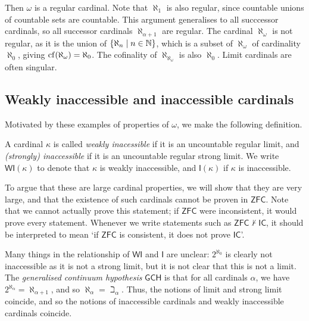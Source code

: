 \begin{enumerate}
    Then \( \omega \) is a regular cardinal.
    Note that \( \aleph_1 \) is also regular, since countable unions of countable sets are countable.
    This argument generalises to all succcessor cardinals, so all successor cardinals \( \aleph_{\alpha + 1} \) are regular.
    The cardinal \( \aleph_\omega \) is not regular, as it is the union of \( \qty{\aleph_n \mid n \in \mathbb N} \), which is a subset of \( \aleph_\omega \) of cardinality \( \aleph_0 \), giving \( \operatorname{cf}(\aleph_\omega) = \aleph_0 \).
    The cofinality of \( \aleph_{\aleph_\omega} \) is also \( \aleph_0 \).
    Limit cardinals are often singular.
\end{enumerate}

\subsection{Weakly inaccessible and inaccessible cardinals}
Motivated by these examples of properties of \( \omega \), we make the following definition.

\begin{definition}
    A cardinal \( \kappa \) is called \emph{weakly inacessible} if it is an uncountable regular limit, and \emph{(strongly) inaccessible} if it is an uncountable regular strong limit.
    We write \( \mathsf{WI}(\kappa) \) to denote that \( \kappa \) is weakly inaccessible, and \( \mathsf{I}(\kappa) \) if \( \kappa \) is inaccessible.
\end{definition}

To argue that these are large cardinal properties, we will show that they are very large, and that the existence of such cardinals cannot be proven in \( \mathsf{ZFC} \).
Note that we cannot actually prove this statement; if \( \mathsf{ZFC} \) were inconsistent, it would prove every statement.
Whenever we write statements such as \( \mathsf{ZFC} \nvdash \mathsf{IC} \), it should be interpreted to mean `if \( \mathsf{ZFC} \) is consistent, it does not prove \( \mathsf{IC} \)'.

Many things in the relationship of \( \mathsf{WI} \) and \( \mathsf{I} \) are unclear: \( 2^{\aleph_0} \) is clearly not inaccessible as it is not a strong limit, but it is not clear that this is not a limit.
The \emph{generalised continuum hypothesis} \( \mathsf{GCH} \) is that for all cardinals \( \alpha \), we have \( 2^{\aleph_\alpha} = \aleph_{\alpha + 1} \), and so \( \aleph_\alpha = \beth_\alpha \).
Thus, the notions of limit and strong limit coincide, and so the notions of inaccessible cardinals and weakly inaccessible cardinals coincide.

